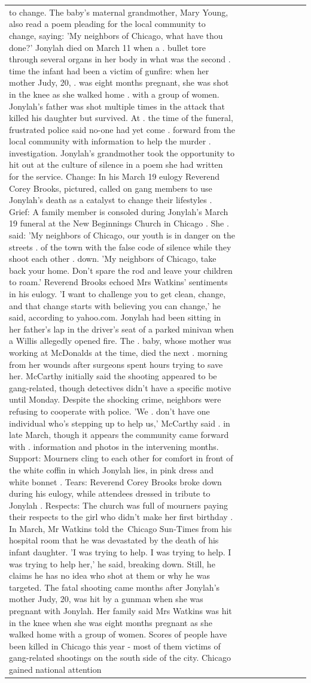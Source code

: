 \begin{table}[H]
\begin{tabular}{lllrlllll}
to change. The baby's maternal grandmother, Mary Young, also read a poem pleading for the local community to change, saying: 'My neighbors of Chicago, what have thou done?' Jonylah died on March 11 when a . bullet tore through several organs in her body in what was the second . time the infant had been a victim of gunfire: when her mother Judy, 20, . was eight months pregnant, she was shot in the knee as she walked home . with a group of women. Jonylah's father was shot multiple times in the attack that killed his daughter but survived. At . the time of the funeral, frustrated police said no-one had yet come . forward from the local community with information to help the murder . investigation. Jonylah's grandmother took the opportunity to hit out at the culture of silence in a poem she had written for the service. Change: In his March 19 eulogy Reverend Corey Brooks, pictured, called on gang members to use Jonylah's death as a catalyst to change their lifestyles . Grief: A family member is consoled during Jonylah's March 19 funeral at the New Beginnings Church in Chicago . She . said: 'My neighbors of Chicago, our youth is in danger on the streets . of the town with the false code of silence while they shoot each other . down. 'My neighbors of Chicago, take back your home. Don't spare the rod and leave your children to roam.' Reverend Brooks echoed Mrs Watkins' sentiments in his eulogy. 'I want to challenge you to get clean, change, and that change starts with believing you can change,' he said, according to yahoo.com. Jonylah had been sitting in her father's lap in the driver's seat of a parked minivan when a Willis allegedly opened fire. The . baby, whose mother was working at McDonalds at the time, died the next . morning from her wounds after surgeons spent hours trying to save her. McCarthy initially said the shooting appeared to be gang-related, though detectives didn't have a specific motive until Monday. Despite the shocking crime, neighbors were refusing to cooperate with police. 'We . don't have one individual who's stepping up to help us,' McCarthy said . in late March, though it appears the community came forward with . information and photos in the intervening months. Support: Mourners cling to each other for comfort in front of the white coffin in which Jonylah lies, in pink dress and white bonnet . Tears: Reverend Corey Brooks broke down during his eulogy, while attendees dressed in tribute to Jonylah . Respects: The church was full of mourners paying their respects to the girl who didn't make her first birthday . In March, Mr Watkins told the Chicago Sun-Times from his hospital room that he was devastated by the death of his infant daughter. 'I was trying to help. I was trying to help. I was trying to help her,' he said, breaking down. Still, he claims he has no idea who shot at them or why he was targeted. The fatal shooting came months after Jonylah's mother Judy, 20, was hit by a gunman when she was pregnant with Jonylah. Her family said Mrs Watkins was hit in the knee when she was eight months pregnant as she walked home with a group of women. Scores of people have been killed in Chicago this year - most of them victims of gang-related shootings on the south side of the city. Chicago gained national attention 
\end{tabular}
\end{table}
